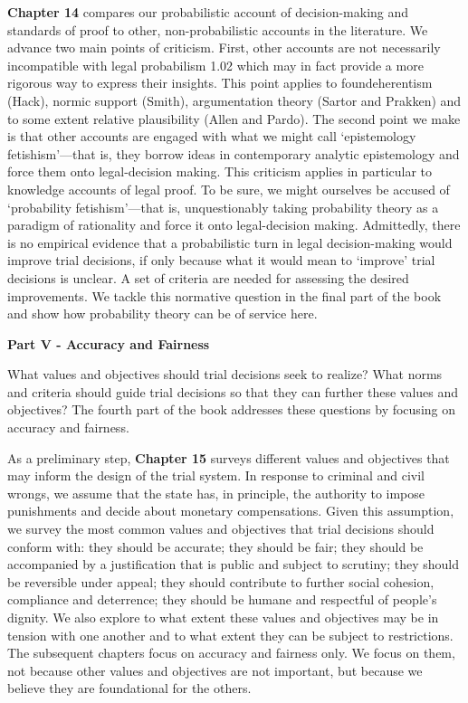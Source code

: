 \documentclass[
  10pt,
  dvipsnames,enabledeprecatedfontcommands]{scrartcl}
\begin{document}
\textbf{Chapter 14} compares our probabilistic account of
decision-making and standards of proof to other, non-probabilistic
accounts in the literature. We advance two main points of criticism.
First, other accounts are not necessarily incompatible with legal
probabilism 1.02 which may in fact provide a more rigorous way to
express their insights. This point applies to foundeherentism (Hack),
normic support (Smith), argumentation theory (Sartor and Prakken) and to
some extent relative plausibility (Allen and Pardo). The second point we
make is that other accounts are engaged with what we might call
`epistemology fetishism'---that is, they borrow ideas in contemporary
analytic epistemology and force them onto legal-decision making. This
criticism applies in particular to knowledge accounts of legal proof. To
be sure, we might ourselves be accused of `probability fetishism'---that
is, unquestionably taking probability theory as a paradigm of
rationality and force it onto legal-decision making. Admittedly, there
is no empirical evidence that a probabilistic turn in legal
decision-making would improve trial decisions, if only because what it
would mean to `improve' trial decisions is unclear. A set of criteria
are needed for assessing the desired improvements. We tackle this
normative question in the final part of the book and show how
probability theory can be of service here.

\vspace{3mm}

\noindent \textbf{Part V - Accuracy and Fairness}

\noindent What values and objectives should trial decisions seek to
realize? What norms and criteria should guide trial decisions so that
they can further these values and objectives? The fourth part of the
book addresses these questions by focusing on accuracy and fairness.

As a preliminary step, \textbf{Chapter 15} surveys different values and
objectives that may inform the design of the trial system. In response
to criminal and civil wrongs, we assume that the state has, in
principle, the authority to impose punishments and decide about monetary
compensations. Given this assumption, we survey the most common values
and objectives that trial decisions should conform with: they should be
accurate; they should be fair; they should be accompanied by a
justification that is public and subject to scrutiny; they should be
reversible under appeal; they should contribute to further social
cohesion, compliance and deterrence; they should be humane and
respectful of people's dignity. We also explore to what extent these
values and objectives may be in tension with one another and to what
extent they can be subject to restrictions. The subsequent chapters
focus on accuracy and fairness only. We focus on them, not because other
values and objectives are not important, but because we believe they are
foundational for the others.
\end{document}
